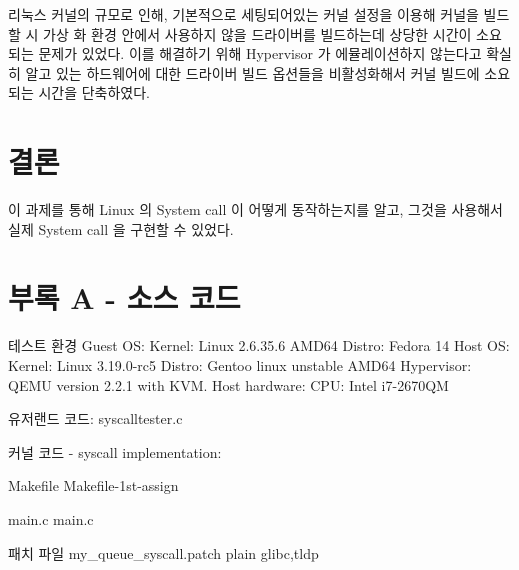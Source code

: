 \documentclass {article}
\begin{document}
리눅스 커널의 규모로 인해, 기본적으로 세팅되어있는 커널 설정을 이용해 커널을 빌드할 시 가상\linebreak
화 환경 안에서 사용하지 않을 드라이버를 빌드하는데 상당한 시간이 소요되는 문제가 있었다. 이를 해결하기 위해 Hypervisor 가 에뮬레이션하지 않는다고 확실히 알고 있는 하드웨어에 대한 드라이버 빌드 옵션들을 비활성화해서 커널 빌드에 소요되는 시간을 단축하였다. 

\section {결론}
이 과제를 통해 Linux 의 System call 이 어떻게 동작하는지를 알고, 그것을 사용해서 실제 System call 을 구현할 수 있었다.

\section {부록 A - 소스 코드}
테스트 환경
Guest OS:\newline
Kernel: Linux 2.6.35.6 AMD64\newline
Distro: Fedora 14\newline
\vspace{\baselineskip}
Host OS:\newline
Kernel: Linux 3.19.0-rc5\newline
Distro: Gentoo linux unstable AMD64\newline
Hypervisor: QEMU version 2.2.1 with KVM.\newline
\vspace{\baselineskip}
Host hardware:\newline
CPU: Intel i7-2670QM\newline

\vspace{\baselineskip}
유저랜드 코드:
{syscalltester.c}

\vspace{\baselineskip}
커널 코드 - syscall implementation:

Makefile
{Makefile-1st-assign}

main.c
{main.c}

패치 파일
{my_queue_syscall.patch}
 {plain}
 {glibc,tldp}
\end{document}

